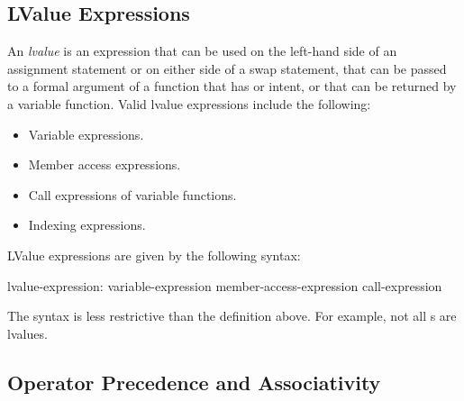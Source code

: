 \subsection{LValue Expressions}
\label{lvalue}

An {\em lvalue} is an expression that can be used on the left-hand
side of an assignment statement or on either side of a swap statement,
that can be passed to a formal argument of a function that
has  or  intent, or that can be returned by a
variable function.  Valid lvalue expressions include the following:
\begin{itemize}
\item
 Variable expressions.
\item
 Member access expressions.
\item
 Call expressions of variable functions.
\item
 Indexing expressions.
\end{itemize}

LValue expressions are given by the following syntax:
\begin{syntax}
lvalue-expression:
  variable-expression
  member-access-expression
  call-expression
\end{syntax}
The syntax is less restrictive than the definition above.  For
example, not all s are lvalues.

\subsection{Operator Precedence and Associativity}
\label{Operator_Precedence_and_Associativity}

